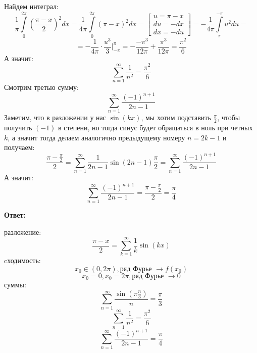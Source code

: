 \documentclass[a4paper,12pt]{article}
\begin{document}
Найдем интеграл:
\[
\frac{1}{\pi} \int\limits_0^{2\pi}\left( \frac{\pi - x}{2}\right)^2 dx = \frac{1}{4\pi} \int\limits_{0}^{2\pi} (\pi - x)^2 dx = 
\begin{bmatrix}
u = \pi - x \\
du = - dx \\
dx = -du 
\end{bmatrix} =  -\frac{1}{4\pi} 
\int\limits_{\pi}^{-\pi} u^2 du  =
\]
\[
=
-
\frac{1}{4\pi} \cdot \frac{u^3}{3} \Bigg|_{-\pi}^{\pi} =
 -\frac{-\pi^3}{12\pi} + \frac{\pi^3}{12\pi} = \frac{\pi^2}{6}
\]
А значит:
\[
\sum_{n = 1}^{\infty} \frac{1}{n^2} = \frac{\pi^2}{6}
\]
Смотрим третью сумму:
\[
\sum_{n = 1}^{\infty} \frac{(-1)^{n+1}}{2n-1}
\]
Заметим, что в разложении у нас $\sin (kx)$, мы хотим подставить $\frac{\pi}{2}$, чтобы получить $(-1)$ в степени, но тогда синус будет обращаться в ноль при четных $k$, а значит тогда делаем аналогично предыдущему номеру $n = 2 k - 1$ и получаем:
\[
\frac{\pi - \frac{\pi}{2}}{2} = \sum_{n = 1}^{\infty} \frac{1}{2n-1} \sin (2n-1) \frac{\pi}{2} = \sum_{n = 1}^{\infty} \frac{(-1)^{n+1}}{2n-1} 
\]
А значит:
\[
\sum_{n = 1}^{\infty} \frac{(-1)^{n+1}}{2n-1}  = \frac{\pi - \frac{\pi}{2}}{2} = \frac{\pi}{4}
\]
\begin{center}
\textbf{Ответ: } 

разложение:
\[
\frac{\pi - x}{2}  = \sum_{k = 1}^{\infty} \frac{1}{k} \sin (kx) 
\]
cходимость:
\[
x_0 \in(0, 2\pi), \text{ряд Фурье }\longrightarrow f(x_0)
\]
\[
x_0 = 0, x_0 = 2\pi, \text{ряд Фурье }\longrightarrow 0
\]
суммы:
\[
\sum_{n = 1}^{\infty} \frac{\sin \left(\pi \frac{n}{3}\right)}{n} = \frac{\pi}{3}
\]
\[
\sum_{n = 1}^{\infty} \frac{1}{n^2} = \frac{\pi^2}{6}
\]
\[
\sum_{n = 1}^{\infty} \frac{(-1)^{n+1}}{2n-1}  = \frac{\pi}{4}
\]
\end{center}
\end{document}
